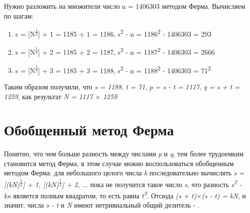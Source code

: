   \begin{example}
    Нужно разложить на множители число n = 1406303 методом Ферма. Вычисляем по шагам:
	\begin{enumerate}
	\item s = [N\textsuperscript{ {$\frac{1}{2}$}}] + 1 = 1185 + 1 = 1186, s\textsuperscript{2} - n = 1186\textsuperscript{2} - 1406303 = 293
	\item s = [N\textsuperscript{ {$\frac{1}{2}$}}] + 2 = 1185 + 2 = 1187, s\textsuperscript{2} - n = 1187\textsuperscript{2} - 1406303 = 2666
	\item s = [N\textsuperscript{ {$\frac{1}{2}$}}] + 3 = 1185 + 3 = 1188, s\textsuperscript{2} - n = 1188\textsuperscript{2} - 1406303 = 71\textsuperscript{2}
	\end{enumerate}

    Таким образом получили, что \textit{s = 1188}, \textit{t = 71}, \textit{p = s - t = 1117}, \textit{q = s + t = 1259}, как результат 
    \textit{N = 1117 {$\times$} 1259}
  \end{example}


\section{Обобщенный метод Ферма}

  \paragraph{} Понятно, что чем больше разность между числами \textit{p} и \textit{q}, тем более трудоемким становится метод Ферма, в этом случае 
  можно воспользоваться обобщенным методом Ферма: для небольшого целого числа \textit{k} последовательно вычислять 
  \textit{s = [(kN)\textsuperscript{ {$\frac{1}{2}$}}] + 1, [(kN)\textsuperscript{ {$\frac{1}{2}$}}] + 2, {$\dots$}} пока не получится такое число \textit{s}, 
  что разность \textit{s\textsuperscript{2} - kn} является полным квадратом, то есть равна \textit{t\textsuperscript{2}}. Отсюда
  \textit{(s + t){$\times$}(s - t) = kN}, и значит, числа \textit{s - t} и \textit{N} имеют нетривиальный общий делитель - 
  \cite[Глава 2.1, страницы 51-53]{ish11}.
  
